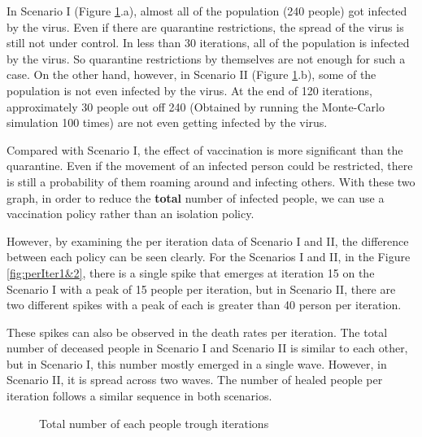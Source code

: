 \documentclass{article}
\begin{document}
\; \; \;In Scenario I (Figure \ref{fig:totalAll}.a), almost all of the population (240 people) got infected by the virus. Even if there are quarantine restrictions, the spread of the virus is still not under control. In less than 30 iterations, all of the population is infected by the virus. So quarantine restrictions by themselves are not enough for such a case. On the other hand, however, in Scenario II (Figure \ref{fig:totalAll}.b), some of the population is not even infected by the virus. At the end of 120 iterations, approximately 30 people out off 240 (Obtained by running the Monte-Carlo simulation 100 times) are not even getting infected by the virus. 

Compared with Scenario I, the effect of vaccination is more significant than the quarantine. Even if the movement of an infected person could be restricted, there is still a probability of them roaming around and infecting others. With these two graph, in order to reduce the \textbf{total} number of infected people, we can use a vaccination policy rather than an isolation policy.

However, by examining the per iteration data of Scenario I and II, the difference between each policy can be seen clearly. For the Scenarios I and II, in the Figure \ref{fig:perIter1&2}, there is a single spike that emerges at iteration 15 on the Scenario I with a peak of 15 people per iteration, but in Scenario II, there are two different spikes with a peak of each is greater than 40 person per iteration. 

These spikes can also be observed in the death rates per iteration. The total number of deceased people in Scenario I and Scenario II is similar to each other, but in Scenario I, this number mostly emerged in a single wave. However, in Scenario II, it is spread across two waves. The number of healed people per iteration follows a similar sequence in both scenarios.


\begin{figure}[h]
    \centering
    \qquad
    \qquad
    \qquad
    \caption{Total number of each people trough iterations}%
    \label{fig:totalAll}%
\end{figure}
\end{document}
